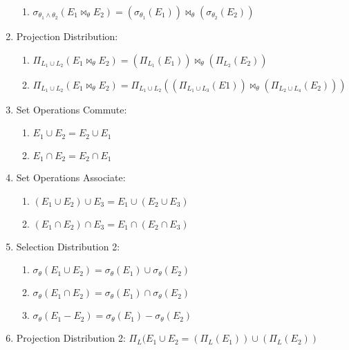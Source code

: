 \documentclass[legalpaper,10pt]{article}
\begin{document}
\begin{enumerate}
\begin{enumerate}
\item $\sigma_{\theta_{1}\wedge\theta_{2}} (E_{1} \bowtie_{\theta} E_{2}) = (\sigma_{\theta_{1}}(E_{1})) \bowtie_{\theta} (\sigma_{\theta_{2}}(E_{2})) $

\end{enumerate}

\item Projection Distribution:

\begin{enumerate}
\item $\Pi_{L_{1} \cup L_{2}}( E_{1} \bowtie_{\theta} E_{2} ) = (\Pi_{L_{1}}(E_{1})) \bowtie_{\theta} (\Pi_{L_{2}}(E_{2}))$

\item $\Pi_{L_{1} \cup L_{2}} (E_{1} \bowtie_{\theta} E_{2}) = \Pi_{L_{1} \cup L_{2}}((\Pi_{L_{1} \cup L_{3}}(E1)) \bowtie_{\theta} (\Pi_{L_{2} \cup L_{4}}(E_{2})))$

\end{enumerate}

\item Set Operations Commute:

\begin{enumerate}

\item $E_{1} \cup E_{2} = E_{2} \cup E_{1}$

\item $E_{1} \cap E_{2} = E_{2} \cap E_{1}$
\end{enumerate}

\item Set Operations Associate:

\begin{enumerate}
\item $(E_{1} \cup E_{2}) \cup E_{3} = E_{1} \cup (E_{2} \cup E_{3})$

\item $(E_{1} \cap E_{2}) \cap E_{3} = E_{1} \cap (E_{2} \cap E_{3})$
\end{enumerate}

\item Selection Distribution 2:

\begin{enumerate}
\item $\sigma_{\theta}(E_{1} \cup E_{2}) = \sigma_{\theta}(E_{1}) \cup \sigma_{\theta}(E_{2})$

\item $\sigma_{\theta}(E_{1} \cap E_{2}) = \sigma_{\theta}(E_{1}) \cap \sigma_{\theta}(E_{2})$

\item $\sigma_{\theta}(E_{1} - E_{2}) = \sigma_{\theta}(E_{1}) - \sigma_{\theta}(E_{2})$
\end{enumerate}

\item Projection Distribution 2: $\Pi_{L}(E_{1} \cup E_{2} = (\Pi_{L}(E_{1}))\cup(\Pi_{L}(E_{2}))$
\end{enumerate}
\end{document}

